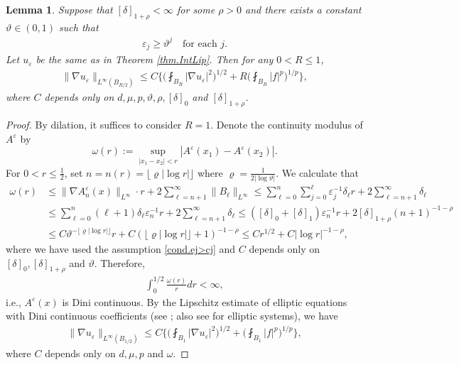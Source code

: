 \documentclass[reqno,12pt]{amsart} %
\newtheorem{lemma}[theorem]{Lemma}
\theoremstyle{definition}
\theoremstyle{remark}
\numberwithin{equation}{section}
\newcommand{\e}{\varepsilon}
\begin{document}
\begin{lemma}\label{int-lip_thm_Dini}
  Suppose that $[\delta]_{1+\rho}<\infty$ for some $\rho>0$ and there exists a constant $\vartheta\in(0, 1)$ such that
  \begin{align}\label{cond.ej>cj}
    \varepsilon_j\geq \vartheta^j\quad \text{for each }j. 
  \end{align}
  Let $u_\varepsilon$ be the same as in Theorem \ref{thm.IntLip}. Then for any $0<R\le 1$,
  \begin{align*}
    \| \nabla u_\e \|_{L^\infty(B_{R/2})} \leq C\bigg\{\bigg(\fint_{B_{R}}|\nabla u_\varepsilon|^2\bigg)^{1/2}+R\bigg(\fint_{B_{R}}|f|^p\bigg)^{1/p}\bigg\},
  \end{align*}
  where $C$ depends only on $d, \mu, p, \vartheta, \rho, [\delta]_0 $ and $[\delta]_{1+\rho}$.
\end{lemma}

\begin{proof}
By dilation, it suffices to consider $R=1$. Denote the continuity modulus of $A^\varepsilon$ by $$\omega(r):=\sup_{|x_1-x_2|<r}|A^\varepsilon(x_1)-A^\varepsilon(x_2)|.$$
For $0<r\leq \frac{1}{2}$, set $n= n(r) = \lfloor \varrho |\log r|\rfloor$ where $\varrho=\frac{1}{2|\log \vartheta|}$. We calculate that
  \begin{align*}
    \omega(r)&\leq \|\nabla A_n^\varepsilon(x)\|_{L^\infty}\cdot r+2\sum_{\ell=n+1}^\infty \| B_\ell \|_{L^\infty} \leq \sum_{\ell=0}^n\sum_{j=0}^\ell \varepsilon_j^{-1}\delta_\ell r+2\sum_{\ell=n+1}^\infty \delta_\ell\\&\leq \sum_{\ell=0}^n(\ell+1)\delta_\ell\varepsilon_n^{-1} r+2\sum_{\ell=n+1}^\infty \delta_\ell\leq ([\delta]_0+[\delta]_{1})\varepsilon_n^{-1}r+2[\delta]_{1+\rho}(n+1)^{-1-\rho}\\&\leq C\vartheta^{-\lfloor \varrho |\log r|\rfloor}r+C(\lfloor \varrho |\log r|\rfloor+1)^{-1-\rho}\leq Cr^{1/2}+C|\log r|^{-1-\rho},
  \end{align*}
  where we have used the assumption \eqref{cond.ej>cj} and $C$ depends only on $[\delta]_0, [\delta]_{1+\rho}$ and $\vartheta$. Therefore,
  \begin{align*}
    \int_0^{1/2} \frac{\omega(r)}{r}dr<\infty,
  \end{align*}
  i.e., $A^\varepsilon(x)$ is Dini continuous. By the Lipschitz estimate of elliptic equations with Dini continuous coefficients (see \cite{Lieb86}; also see \cite{Li2017} for elliptic systems), we have
  \begin{align*}
    \| \nabla u_\e\|_{L^\infty(B_{1/2})} \leq C\bigg\{\bigg(\fint_{B_1}|\nabla u_\varepsilon|^2\bigg)^{1/2}+\bigg(\fint_{B_1}|f|^p\bigg)^{1/p}\bigg\},
  \end{align*}
  where $C$ depends only on $d, \mu, p $ and $\omega$.
\end{proof}
\end{document}
